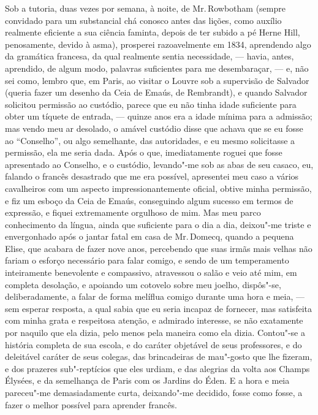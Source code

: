 Sob a tutoria, duas vezes por semana, à noite, de Mr.\,Rowbotham (sempre convidado para um substancial chá conosco antes das lições, como
auxílio realmente eficiente a sua ciência faminta, depois de ter subido
a pé Herne Hill, penosamente, devido à asma), prosperei razoavelmente em
1834, aprendendo algo da gramática francesa, da qual realmente sentia
necessidade, --- havia, antes, aprendido, de algum modo, palavras
suficientes para me desembaraçar, --- e, não sei como, lembro que, em
Paris, ao visitar o Louvre sob a supervisão de Salvador (queria fazer
um desenho da Ceia de Emaús, de Rembrandt), e quando Salvador solicitou
permissão ao custódio, parece que eu não tinha idade suficiente para
obter um tíquete de entrada, --- quinze anos era a idade mínima para a
admissão; mas vendo meu ar desolado, o amável custódio disse que achava
que se eu fosse ao ``Conselho'', ou algo semelhante, das autoridades, e
eu mesmo solicitasse a permissão, ela me seria dada. Após o que,
imediatamente roguei que fosse apresentado ao Conselho, e o custódio,
levando"-me sob as abas de seu casaco, eu, falando o francês desastrado
que me era possível, apresentei meu caso a vários cavalheiros com um
aspecto impressionantemente oficial, obtive minha permissão, e fiz um
esboço da Ceia de Emaús, conseguindo algum sucesso em termos de
expressão, e fiquei extremamente orgulhoso de mim. Mas meu parco
conhecimento da língua, ainda que suficiente para o dia a dia, deixou"-me
triste e envergonhado após o jantar fatal em casa de Mr.\,Domecq, quando a
pequena Elise, que acabara de fazer nove anos, percebendo que suas irmãs
mais velhas não fariam o esforço necessário para falar comigo, e sendo
de um temperamento inteiramente benevolente e compassivo, atravessou o
salão e veio até mim, em completa desolação, e apoiando um cotovelo
sobre meu joelho, dispôs"-se, deliberadamente, a falar de forma melíflua
comigo durante uma hora e meia, --- sem esperar resposta, a qual sabia
que eu seria incapaz de fornecer, mas satisfeita com minha grata e
respeitosa atenção, e admirado interesse, se não exatamente por naquilo
que ela dizia, pelo menos pela maneira como ela dizia. Contou"-se a
história completa de sua escola, e do caráter objetável de seus
professores, e do deleitável caráter de seus colegas, das brincadeiras
de mau"-gosto que lhe fizeram, e dos prazeres sub"-reptícios que eles
urdiam, e das alegrias da volta aos Champs Élysées, e da semelhança de
Paris com os Jardins do Éden. E a hora e meia pareceu"-me demasiadamente
curta, deixando"-me decidido, fosse como fosse, a fazer o melhor possível
para aprender francês.

